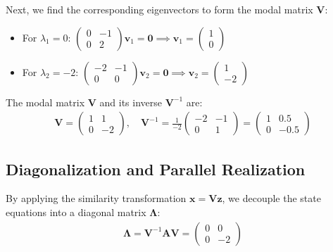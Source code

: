 \documentclass[journal,12pt,onecolumn]{IEEEtran}
\theoremstyle{remark}
\begin{document}
Next, we find the corresponding eigenvectors to form the modal matrix $\mathbf{V}$:
\begin{itemize}
    \item For $\lambda_1 = 0$: 
    $\begin{pmatrix} 0 & -1 \\ 0 & 2 \end{pmatrix} \mathbf{v}_1 = \mathbf{0} \implies \mathbf{v}_1 = \begin{pmatrix} 1 \\ 0 \end{pmatrix}$
    
    \item For $\lambda_2 = -2$: 
    $\begin{pmatrix} -2 & -1 \\ 0 & 0 \end{pmatrix} \mathbf{v}_2 = \mathbf{0} \implies \mathbf{v}_2 = \begin{pmatrix} 1 \\ -2 \end{pmatrix}$
\end{itemize}

The modal matrix $\mathbf{V}$ and its inverse $\mathbf{V}^{-1}$ are:
\begin{align*}
\mathbf{V} = \begin{pmatrix} 1 & 1 \\ 0 & -2 \end{pmatrix}, \quad \mathbf{V}^{-1} = \frac{1}{-2} \begin{pmatrix} -2 & -1 \\ 0 & 1 \end{pmatrix} = \begin{pmatrix} 1 & 0.5 \\ 0 & -0.5 \end{pmatrix}
\end{align*}

\subsection{Diagonalization and Parallel Realization}
By applying the similarity transformation $\mathbf{x} = \mathbf{V}\mathbf{z}$, we decouple the state equations into a diagonal matrix $\mathbf{\Lambda}$:
\begin{align*}
\mathbf{\Lambda} = \mathbf{V}^{-1}\mathbf{A}\mathbf{V} = \begin{pmatrix} 0 & 0 \\ 0 & -2 \end{pmatrix}
\end{align*}
\end{document}
